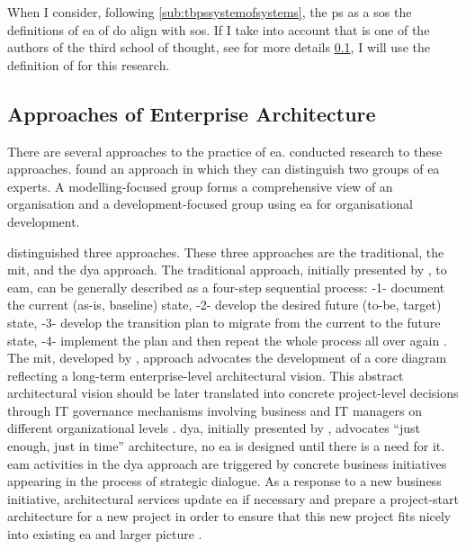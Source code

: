 When I consider, following \cref{sub:tbpssystemofsystems}, the \gls{ps} as a \acrfull{sos} the definitions of \acrshort{ea} of \textcite{Gartner,Graves2009} do align with \acrshort{sos}. If I take into account that \textcite{Graves2009} is one of the authors of the third school of thought, see for more details \cref{sub:eaapproaches}, I will use the definition of \citeauthor{Graves2009} for this research.

\subsection{Approaches of Enterprise Architecture}
\label{sub:eaapproaches}
There are several approaches to the practice of \acrshort{ea}. \textcite{Ylinen2018,Ylinen2020,Kotusev2015,Lapalme2012} conducted research to these approaches. \textcite{Ylinen2018,Ylinen2020} found an approach in which they can distinguish two groups of \acrshort{ea} experts. A modelling-focused group forms a comprehensive view of an organisation and a development-focused group using \acrshort{ea} for organisational development. 

\textcite{Kotusev2015} distinguished three approaches. These three approaches are the traditional, the \acrfull{mit}, and the \acrfull{dya} approach. The traditional approach, initially presented by \textcite{Spewak1993}, to \acrfull{eam}, can be generally described as a four-step sequential process: -1- document the current (as-is, baseline) state, -2- develop the desired future (to-be, target) state, -3- develop the transition plan to migrate from the current to the future state, -4- implement the plan and then repeat the whole process all over again \parencite[p. 4071]{Kotusev2015}. The \acrshort{mit}, developed by \textcite{Ross2014}, approach advocates the development of a core diagram reflecting a long-term enterprise-level architectural vision. This abstract architectural vision should be later translated into concrete project-level decisions through IT governance mechanisms involving business and IT managers on different organizational levels \parencite[p. 4072]{Kotusev2015}. \acrfull{dya}, initially presented by \textcite{Wagter2005}, advocates “just enough, just in time” architecture, no \acrshort{ea} is designed until there is a need for it. \acrshort{eam} activities in the \acrshort{dya} approach are triggered by concrete business initiatives appearing in the process of strategic dialogue. As a response to a new business initiative, architectural services update \acrshort{ea} if necessary and prepare a project-start architecture for a new project in order to ensure that this new project fits nicely into existing \acrshort{ea} and larger picture \parencite[p. 4072]{Kotusev2015}. 

